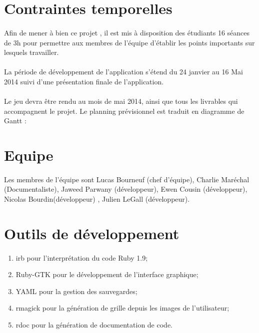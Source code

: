 \section{Contraintes temporelles}
\paragraph*{}
Afin de mener à bien ce projet , il est mis à disposition des étudiants 16 séances de 3h pour permettre aux membres de l'équipe d'établir les points importants sur lesquels travailler.
\paragraph*{}
La période de développement de l’application s’étend du 24 janvier au 16 Mai 2014 suivi d’une présentation finale de l’application. %
\paragraph*{}
Le jeu devra être rendu au mois de mai 2014, ainsi que tous les livrables qui accompagnent le projet.
Le planning prévisionnel est traduit en diagramme de Gantt :


\section {Equipe}
\paragraph*{}
Les membres de l'équipe sont Lucas Bourneuf (chef d'équipe), Charlie Maréchal (Documentaliste), Jaweed Parwany (développeur), Ewen Cousin (développeur), Nicolas Bourdin(développeur) , Julien LeGall (développeur).



\section{Outils de développement}
\paragraph*{}
\begin{enumerate}
\item irb pour l'interprétation du code Ruby 1.9;
\item Ruby-GTK pour le développement de l'interface graphique;
\item YAML pour la gestion des sauvegardes; %
\item rmagick pour la génération de grille depuis les images de l'utilisateur;
\item rdoc pour la génération de documentation de code.
\end{enumerate}






